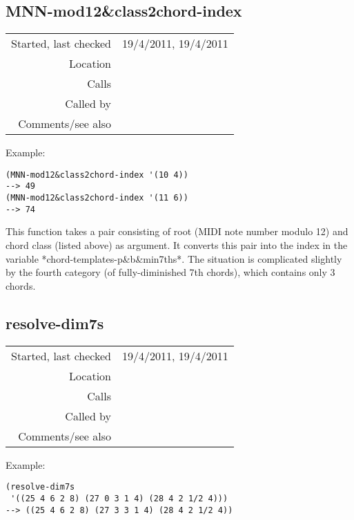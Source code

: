 \subsection*{MNN-mod12\&class2chord-index}\label{fun:MNN-mod12nclass2chord-index}

\vspace{0.3cm}
\begin{tabular}{r|p{8cm}}
Started, last checked & 19/4/2011, 19/4/2011 \\
Location & \nameref{sec:chord-labelling} \\
Calls & \\
Called by & \\
Comments/see also & 
\end{tabular}

\vspace{0.5cm}
\noindent Example:
\begin{verbatim}
(MNN-mod12&class2chord-index '(10 4))
--> 49
(MNN-mod12&class2chord-index '(11 6))
--> 74
\end{verbatim}

\noindent This function takes a pair consisting of
root (MIDI note number modulo 12) and chord class
(listed above) as argument. It converts this pair into
the index in the variable
*chord-templates-p\&b\&min7ths*. The situation is
complicated slightly by the fourth category (of
fully-diminished 7th chords), which contains only 3
chords.


\subsection*{resolve-dim7s}\label{fun:resolve-dim7s}

\vspace{0.3cm}
\begin{tabular}{r|p{8cm}}
Started, last checked & 19/4/2011, 19/4/2011 \\
Location & \nameref{sec:chord-labelling} \\
Calls & \\
Called by & \nameref{fun:HarmAn->} \\
Comments/see also & \nameref{fun:resolve-dim7s-roman}
\end{tabular}

\vspace{0.5cm}
\noindent Example:
\begin{verbatim}
(resolve-dim7s
 '((25 4 6 2 8) (27 0 3 1 4) (28 4 2 1/2 4)))
--> ((25 4 6 2 8) (27 3 3 1 4) (28 4 2 1/2 4))
\end{verbatim}

